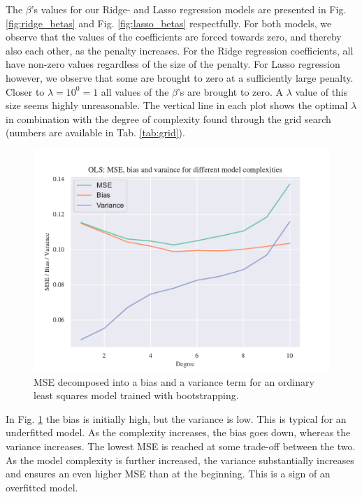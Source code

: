 The $\beta$'s values for our Ridge- and Lasso regression models are presented in Fig. \ref{fig:ridge_betas} and Fig. \ref{fig:lasso_betas} respectfully. For both models, we observe that the values of the coefficients are forced towards zero, and thereby also each other, as the penalty increases. For the Ridge regression coefficients, all have non-zero values regardless of the size of the penalty. For Lasso regression however, we observe that some are brought to zero at a sufficiently large penalty. Closer to $\lambda = 10^0 = 1$ all values of the $\beta$'s are brought to zero. A $\lambda$ value of this size seems highly unreasonable.   The vertical line in each plot shows the optimal $\lambda$ in combination with the degree of complexity found through the grid search (numbers are available in Tab. \ref{tab:grid}).

\begin{figure}
    \centering
    \includegraphics[width=1\linewidth]{project_1_alt/figures/figures_in_report/bias_var_Franke_Noise_bootstrap.pdf}
    \caption{MSE decomposed into a bias and a variance term for an ordinary least squares model trained with bootstrapping.}
    \label{bias_var_trade}
\end{figure}


In Fig. \ref{bias_var_trade} the bias is initially high, but the variance is low. This is typical for an underfitted model. As the complexity increases, the bias goes down, whereas the variance increases. The lowest MSE is reached at some trade-off between the two. As the model complexity is further increased, the variance substantially increases and ensures an even higher MSE than at the beginning. This is a sign of an overfitted model.

